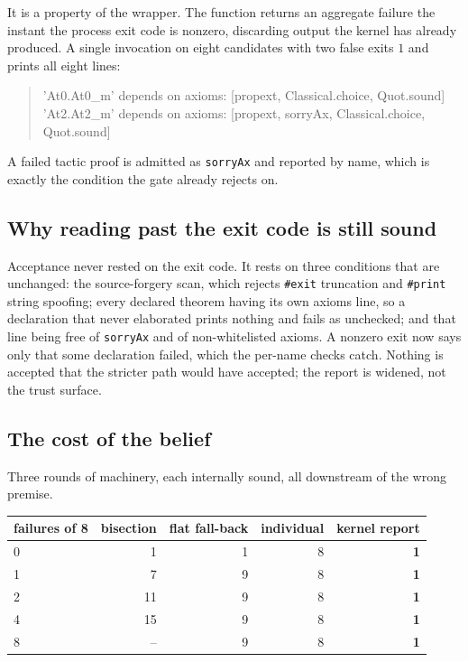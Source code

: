 \documentclass[11pt,a4paper]{article}
\theoremstyle{definition}
\theoremstyle{remark}
\begin{document}
It is a property of the wrapper. The function returns an aggregate failure the
instant the process exit code is nonzero, discarding output the kernel has
already produced. A single invocation on eight candidates with two false exits
$1$ and prints all eight lines:

\begin{quote}\small\ttfamily
'At0.At0\_m' depends on axioms: [propext, Classical.choice, Quot.sound]\\
'At2.At2\_m' depends on axioms: [propext, sorryAx, Classical.choice, Quot.sound]
\end{quote}

A failed tactic proof is admitted as \texttt{sorryAx} and reported by name,
which is exactly the condition the gate already rejects on.

\subsection{Why reading past the exit code is still sound}

Acceptance never rested on the exit code. It rests on three conditions that are
unchanged: the source-forgery scan, which rejects \texttt{\#exit} truncation and
\texttt{\#print} string spoofing; every declared theorem having its own axioms
line, so a declaration that never elaborated prints nothing and fails as
unchecked; and that line being free of \texttt{sorryAx} and of non-whitelisted
axioms. A nonzero exit now says only that some declaration failed, which the
per-name checks catch. Nothing is accepted that the stricter path would have
accepted; the report is widened, not the trust surface.

\subsection{The cost of the belief}

Three rounds of machinery, each internally sound, all downstream of the wrong
premise.

\begin{center}
\begin{tabular}{lrrrr}
\toprule
failures of 8 & bisection & flat fall-back & individual & kernel report \\
\midrule
0 & 1  & 1 & 8 & \textbf{1} \\
1 & 7  & 9 & 8 & \textbf{1} \\
2 & 11 & 9 & 8 & \textbf{1} \\
4 & 15 & 9 & 8 & \textbf{1} \\
8 & -- & 9 & 8 & \textbf{1} \\
\bottomrule
\end{tabular}
\end{center}
\end{document}

